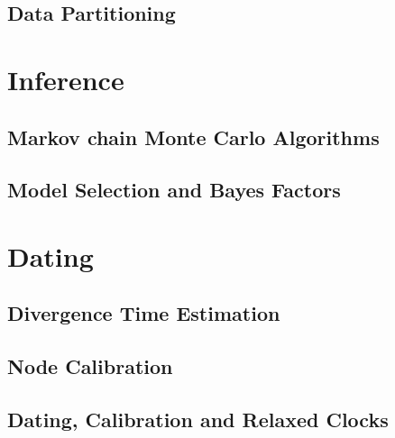 \documentclass[11pt]{book}
\begin{document}
\chapter{Data Partitioning}
\def \ResourcePath {RB_Partition_Tutorial/}






\part{Inference}

\chapter{Markov chain Monte Carlo Algorithms}
\def \ResourcePath {RB_MCMC_Tutorial/}


\chapter{Model Selection and Bayes Factors}
\def \ResourcePath {RB_BayesFactor_Tutorial/}






\part{Dating}
\chapter{Divergence Time Estimation}
\def \ResourcePath {RB_DivergenceTime_Tutorial/}


\chapter{Node Calibration}
\def \ResourcePath {RB_NodeCalibration_Tutorial/}


\chapter{Dating, Calibration and Relaxed Clocks}
\def \ResourcePath {RB_Calibration_and_RelaxedClock_Tutorial/}

\end{document}
